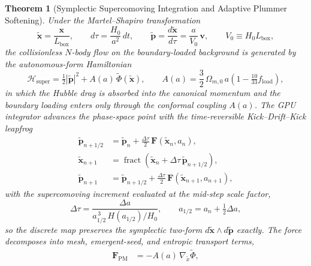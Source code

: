 \documentclass[11pt,letterpaper]{article}
\theoremstyle{plain}
\newtheorem{theorem}{Theorem}
\newcommand{\fload}{f_{\text{load}}}
\begin{document}
\begin{theorem}[Symplectic Supercomoving Integration and Adaptive Plummer Softening]
\label{thm:supercomoving-kdk}
Under the Martel--Shapiro transformation
\begin{equation}
\label{eq:supercomoving-map}
 \tilde{\mathbf{x}}=\frac{\mathbf{x}}{L_{\mathrm{box}}},\qquad
 d\tau=\frac{H_{0}}{a^{2}}\,dt,\qquad
 \tilde{\mathbf{p}}=\frac{d\tilde{\mathbf{x}}}{d\tau}
 =\frac{a}{V_{0}}\,\mathbf{v},\qquad
 V_{0}\equiv H_{0}L_{\mathrm{box}},
\end{equation}
the collisionless $N$-body flow on the boundary-loaded background is
generated by the autonomous-form Hamiltonian
\begin{equation}
\label{eq:supercomoving-hamiltonian}
 \mathcal{H}_{\mathrm{super}}
 =\tfrac{1}{2}|\tilde{\mathbf{p}}|^{2}
 +A(a)\,\tilde{\Phi}(\tilde{\mathbf{x}}),
 \qquad
 A(a)=\frac{3}{2}\,\Omega_{m,0}\,a\!\left(1-\tfrac{10}{33}\fload\right),
\end{equation}
in which the Hubble drag is absorbed into the canonical momentum and
the boundary loading enters only through the conformal coupling
$A(a)$.  The GPU integrator advances the phase-space point with the
time-reversible Kick--Drift--Kick leapfrog
\begin{align}
 \tilde{\mathbf{p}}_{n+1/2}
 &=\tilde{\mathbf{p}}_{n}
 +\frac{\Delta\tau}{2}\,\mathbf{F}(\tilde{\mathbf{x}}_{n},a_{n}),
 \label{eq:kdk-kick1}\\
 \tilde{\mathbf{x}}_{n+1}
 &=\operatorname{fract}\!\left(
   \tilde{\mathbf{x}}_{n}+\Delta\tau\,\tilde{\mathbf{p}}_{n+1/2}\right),
 \label{eq:kdk-drift}\\
 \tilde{\mathbf{p}}_{n+1}
 &=\tilde{\mathbf{p}}_{n+1/2}
 +\frac{\Delta\tau}{2}\,\mathbf{F}(\tilde{\mathbf{x}}_{n+1},a_{n+1}),
 \label{eq:kdk-kick2}
\end{align}
with the supercomoving increment evaluated at the mid-step scale factor,
\begin{equation}
\label{eq:supercomoving-dtau}
 \Delta\tau
 =\frac{\Delta a}{a_{1/2}^{\,3}\,H(a_{1/2})/H_{0}},
 \qquad
 a_{1/2}=a_{n}+\tfrac{1}{2}\Delta a ,
\end{equation}
so the discrete map preserves the symplectic two-form
$d\tilde{\mathbf{x}}\wedge d\tilde{\mathbf{p}}$ exactly.  The force
decomposes into mesh, emergent-seed, and entropic transport terms,
\begin{align}
 \mathbf{F}_{\mathrm{PM}}
 &=-A(a)\,\nabla_{\tilde{x}}\tilde{\Phi},
 \label{eq:kdk-force-pm}\\

\end{align}
\end{theorem}
\end{document}
